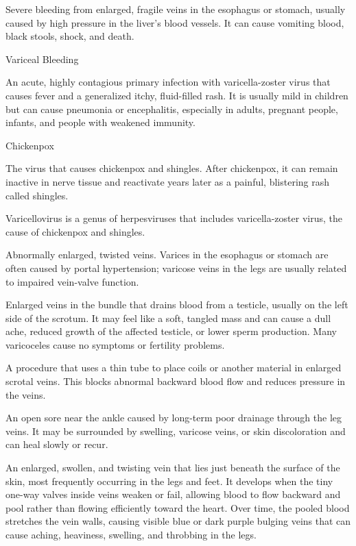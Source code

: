  Severe bleeding from enlarged, fragile veins in the esophagus or stomach, usually caused by high pressure in the liver’s blood vessels. It can cause vomiting blood, black stools, shock, and death.

\synonyms
Variceal Bleeding

 An acute, highly contagious primary infection with varicella-zoster virus that
causes fever and a generalized itchy, fluid-filled rash. It is usually mild in children but can cause
pneumonia or encephalitis, especially in adults, pregnant people, infants, and people with weakened
immunity.

\synonyms
Chickenpox

 The virus that causes chickenpox and shingles. After chickenpox, it can remain inactive in nerve tissue and reactivate years later as a painful, blistering rash called shingles.

 Varicellovirus is a genus of herpesviruses that includes varicella-zoster virus, the cause of chickenpox and shingles.

 Abnormally enlarged, twisted veins. Varices in the esophagus or stomach are often caused by portal hypertension; varicose veins in the legs are usually related to impaired vein-valve function.

 Enlarged veins in the bundle that drains blood from a testicle, usually on the left side of the scrotum. It may feel like a soft, tangled mass and can cause a dull ache, reduced growth of the affected testicle, or lower sperm production. Many varicoceles cause no symptoms or fertility problems.

 A procedure that uses a thin tube to place coils or another material in enlarged scrotal veins. This blocks abnormal backward blood flow and reduces pressure in the veins.

 An open sore near the ankle caused by long-term poor drainage through the leg veins. It may be surrounded by swelling, varicose veins, or skin discoloration and can heal slowly or recur.

 An enlarged, swollen, and twisting vein that lies just beneath the surface of the skin, most frequently occurring in the legs and feet. It develops when the tiny one-way valves inside veins weaken or fail, allowing blood to flow backward and pool rather than flowing efficiently toward the heart. Over time, the pooled blood stretches the vein walls, causing visible blue or dark purple bulging veins that can cause aching, heaviness, swelling, and throbbing in the legs.

